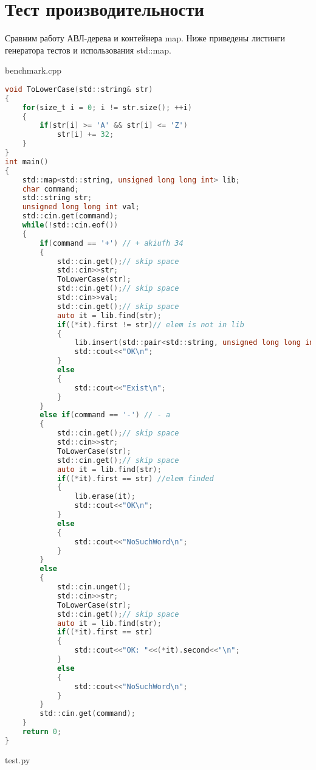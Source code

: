 \section{Тест производительности}
Сравним работу АВЛ-дерева и контейнера map. Ниже приведены листинги генератора тестов и использования std::map.

benchmark.cpp
\begin{lstlisting}[language=C]
void ToLowerCase(std::string& str)
{
    for(size_t i = 0; i != str.size(); ++i)
    {
        if(str[i] >= 'A' && str[i] <= 'Z')
            str[i] += 32;
    }
}
int main()
{
    std::map<std::string, unsigned long long int> lib;
    char command;
    std::string str;
    unsigned long long int val;
    std::cin.get(command);
    while(!std::cin.eof())
    {
        if(command == '+') // + akiufh 34
        {
            std::cin.get();// skip space
            std::cin>>str;
            ToLowerCase(str);
            std::cin.get();// skip space
            std::cin>>val;
            std::cin.get();// skip space
            auto it = lib.find(str);
            if((*it).first != str)// elem is not in lib
            {
                lib.insert(std::pair<std::string, unsigned long long int>(str, val));            
                std::cout<<"OK\n";
            }
            else
            {
                std::cout<<"Exist\n";
            }
        }
        else if(command == '-') // - a
        {
            std::cin.get();// skip space
            std::cin>>str;
            ToLowerCase(str);            
            std::cin.get();// skip space            
            auto it = lib.find(str);
            if((*it).first == str) //elem finded
            {
                lib.erase(it);
                std::cout<<"OK\n";
            }
            else
            {
                std::cout<<"NoSuchWord\n";
            }
        }
        else
        {
            std::cin.unget();
            std::cin>>str;
            ToLowerCase(str);        
            std::cin.get();// skip space
            auto it = lib.find(str);
            if((*it).first == str)
            {
                std::cout<<"OK: "<<(*it).second<<"\n";
            }
            else
            {
                std::cout<<"NoSuchWord\n";
            }
        }
        std::cin.get(command);
    } 
    return 0;
}
\end{lstlisting}
test.py
